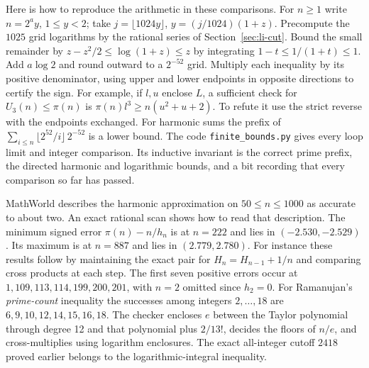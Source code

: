 Here is how to reproduce the arithmetic in these comparisons. For $n\ge1$ write $n=2^a y$, $1\le y<2$; take $j=\lfloor1024y\rfloor$, $y=(j/1024)(1+z)$. Precompute the $1025$ grid logarithms by the rational series of Section~\ref{sec:li-cut}. Bound the small remainder by $z-z^2/2\le\log(1+z)\le z$ by integrating $1-t\le1/(1+t)\le1$. Add $a\log2$ and round outward to a $2^{-52}$ grid. Multiply each inequality by its positive denominator, using upper and lower endpoints in opposite directions to certify the sign. For example, if $l,u$ enclose $L$, a sufficient check for $U_3(n)\le\pi(n)$ is $\pi(n)l^3\ge n(u^2+u+2)$. To refute it use the strict reverse with the endpoints exchanged. For harmonic sums the prefix of $\sum_{i\le n}\lfloor2^{52}/i\rfloor\,2^{-52}$ is a lower bound. The code \texttt{finite\_bounds.py} gives every loop limit and integer comparison. Its inductive invariant is the correct prime prefix, the directed harmonic and logarithmic bounds, and a bit recording that every comparison so far has passed.

MathWorld describes the harmonic approximation on $50\le n\le1000$ as accurate to about two. An exact rational scan shows how to read that description. The minimum signed error $\pi(n)-n/h_n$ is at $n=222$ and lies in $(-2.530,-2.529)$. Its maximum is at $n=887$ and lies in $(2.779,2.780)$. For instance these results follow by maintaining the exact pair for $H_n=H_{n-1}+1/n$ and comparing cross products at each step. The first seven positive errors occur at $1,109,113,114,199,200,201$, with $n=2$ omitted since $h_2=0$. For Ramanujan's \emph{prime-count} inequality the successes among integers $2,\ldots,18$ are $6,9,10,12,14,15,16,18$. The checker encloses $e$ between the Taylor polynomial through degree 12 and that polynomial plus $2/13!$, decides the floors of $n/e$, and cross-multiplies using logarithm enclosures. The exact all-integer cutoff $2418$ proved earlier belongs to the logarithmic-integral inequality.

